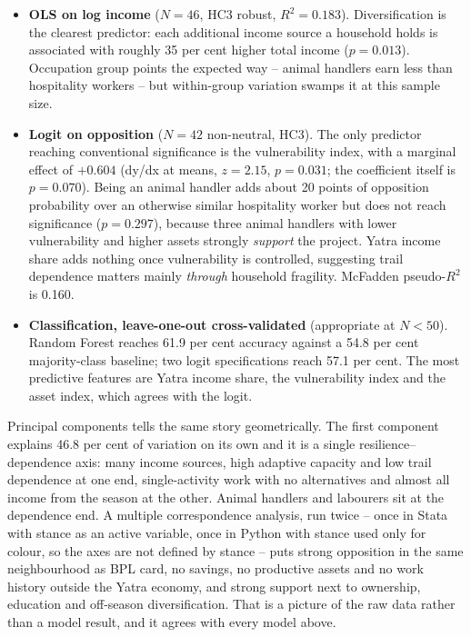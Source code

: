 \documentclass[11pt]{article}
\begin{document}
\begin{itemize}
    \item \textbf{OLS on log income} ($N=46$, HC3 robust, $R^2 = 0.183$). Diversification is the clearest predictor: each additional income source a household holds is associated with roughly 35 per cent higher total income ($p = 0.013$). Occupation group points the expected way -- animal handlers earn less than hospitality workers -- but within-group variation swamps it at this sample size.
    \item \textbf{Logit on opposition} ($N=42$ non-neutral, HC3). The only predictor reaching conventional significance is the vulnerability index, with a marginal effect of $+0.604$ (dy/dx at means, $z=2.15$, $p=0.031$; the coefficient itself is $p=0.070$). Being an animal handler adds about 20 points of opposition probability over an otherwise similar hospitality worker but does not reach significance ($p=0.297$), because three animal handlers with lower vulnerability and higher assets strongly \emph{support} the project. Yatra income share adds nothing once vulnerability is controlled, suggesting trail dependence matters mainly \emph{through} household fragility. McFadden pseudo-$R^2$ is 0.160.
    \item \textbf{Classification, leave-one-out cross-validated} (appropriate at $N<50$). Random Forest reaches 61.9 per cent accuracy against a 54.8 per cent majority-class baseline; two logit specifications reach 57.1 per cent. The most predictive features are Yatra income share, the vulnerability index and the asset index, which agrees with the logit.
\end{itemize}

Principal components tells the same story geometrically. The first component explains 46.8 per
cent of variation on its own and it is a single resilience--dependence axis: many income
sources, high adaptive capacity and low trail dependence at one end, single-activity work with
no alternatives and almost all income from the season at the other. Animal handlers and
labourers sit at the dependence end. A multiple correspondence analysis, run twice -- once in
Stata with stance as an active variable, once in Python with stance used only for colour, so
the axes are not defined by stance -- puts strong opposition in the same neighbourhood as BPL
card, no savings, no productive assets and no work history outside the Yatra economy, and
strong support next to ownership, education and off-season diversification. That is a picture
of the raw data rather than a model result, and it agrees with every model above.
\end{document}

